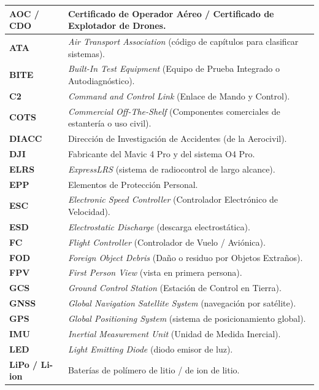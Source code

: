\begin{longtable}{|p{}|p{}|}
\textbf{AOC / CDO} & Certificado de Operador Aéreo / Certificado de Explotador de Drones. \\ \hline
\textbf{ATA} & \textit{Air Transport Association} (código de capítulos para clasificar sistemas). \\ \hline
\textbf{BITE} & \textit{Built-In Test Equipment} (Equipo de Prueba Integrado o Autodiagnóstico). \\ \hline
\textbf{C2} & \textit{Command and Control Link} (Enlace de Mando y Control). \\ \hline
\textbf{COTS} & \textit{Commercial Off-The-Shelf} (Componentes comerciales de estantería o uso civil). \\ \hline
\textbf{DIACC} & Dirección de Investigación de Accidentes (de la Aerocivil). \\ \hline
\textbf{DJI} & Fabricante del Mavic 4 Pro y del sistema O4 Pro. \\ \hline
\textbf{ELRS} & \textit{ExpressLRS} (sistema de radiocontrol de largo alcance). \\ \hline
\textbf{EPP} & Elementos de Protección Personal. \\ \hline
\textbf{ESC} & \textit{Electronic Speed Controller} (Controlador Electrónico de Velocidad). \\ \hline
\textbf{ESD} & \textit{Electrostatic Discharge} (descarga electrostática). \\ \hline
\textbf{FC} & \textit{Flight Controller} (Controlador de Vuelo / Aviónica). \\ \hline
\textbf{FOD} & \textit{Foreign Object Debris} (Daño o residuo por Objetos Extraños). \\ \hline
\textbf{FPV} & \textit{First Person View} (vista en primera persona). \\ \hline
\textbf{GCS} & \textit{Ground Control Station} (Estación de Control en Tierra). \\ \hline
\textbf{GNSS} & \textit{Global Navigation Satellite System} (navegación por satélite). \\ \hline
\textbf{GPS} & \textit{Global Positioning System} (sistema de posicionamiento global). \\ \hline
\textbf{IMU} & \textit{Inertial Measurement Unit} (Unidad de Medida Inercial). \\ \hline
\textbf{LED} & \textit{Light Emitting Diode} (diodo emisor de luz). \\ \hline
\textbf{LiPo / Li-ion} & Baterías de polímero de litio / de ion de litio. \\ \hline

\end{longtable}
